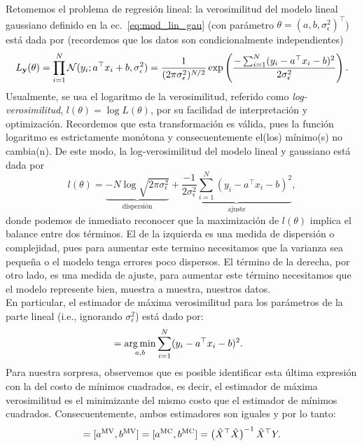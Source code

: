 Retomemos el problema  de regresión lineal: la verosimilitud del modelo lineal gaussiano  definido en la ec.~\eqref{eq:mod_lin_gau} (con parámetro $\theta  = (a,b,\sigma_\epsilon^2)^\top$) está dada por (recordemos  que  los datos son condicionalmente independientes)
\begin{equation}
	L_{\mathbf{y}}(\theta) =  \prod_{i=1}^N {\mathcal N}(y_i;a^\top x_i + b,\sigma_\epsilon^2) = \frac{1}{(2\pi\sigma_\epsilon^2)^{N/2}}  \exp\left(\frac{-\sum_{i=1}^N(y_i-a^\top x_i - b)^2}{2\sigma_\epsilon^2}\right). \label{eq:verosimilitud_lineal}
\end{equation} 
Usualmente, se usa el logaritmo de la verosimilitud, referido como \emph{log-verosimilitud}, $l(\theta) = \log L(\theta)$, por su facilidad de interpretación y optimización. Recordemos que esta transformación es válida, pues la función logaritmo es estrictamente monótona y consecuentemente el(los) mínimo(s) no cambia(n).  De este modo, la log-verosimilitud del modelo lineal y gaussiano está dada por
\begin{equation}
	l(\theta) 
		= \underbrace{-N\log \sqrt{2\pi\sigma^2_\epsilon}}_{\text{dispersión}} + \underbrace{\frac{-1}{2\sigma_\epsilon^2} \sum_{i=1}^N (y_i-a^\top x_i - b)^2}_{\text{ajuste}},
\end{equation}
donde podemos de inmediato reconocer que la maximización de $l(\theta)$ implica el balance entre dos términos. El de la izquierda es una medida de dispersión o complejidad, pues para aumentar este termino necesitamos que la varianza sea pequeña o el modelo tenga errores poco dispersos. El término de la derecha, por otro lado, es una medida de ajuste, para aumentar este término necesitamos que el modelo  represente bien, muestra a muestra, nuestros datos. \\

En particular, el estimador  de máxima verosimilitud para los parámetros de  la parte lineal (i.e., ignorando $\sigma^2_\epsilon$) está dado por:
\begin{align}
	 [a^{\text{MV}} ,b^{\text{MV}} ]
						&= \argmin_{a,b} \sum_{i=1}^N (y_i-a^\top x_i - b)^2. \label{eq:theta_ML}
\end{align}
Para  nuestra  sorpresa, observemos que es posible identificar esta última expresión con la del costo de mínimos cuadrados, es decir, el estimador de máxima verosimilitud es el minimizante del mismo costo que el estimador de mínimos cuadrados. Consecuentemente, ambos estimadores son iguales y por lo tanto:
\begin{equation}
	 [\hat{a},\hat{b}] = [a^{\text{MV}} ,b^{\text{MV}} ]=[a^{\text{MC}} ,b^{\text{MC}} ] = \left(\tX^\top\tX\right)^{-1} \tX^\top Y.
\end{equation}

